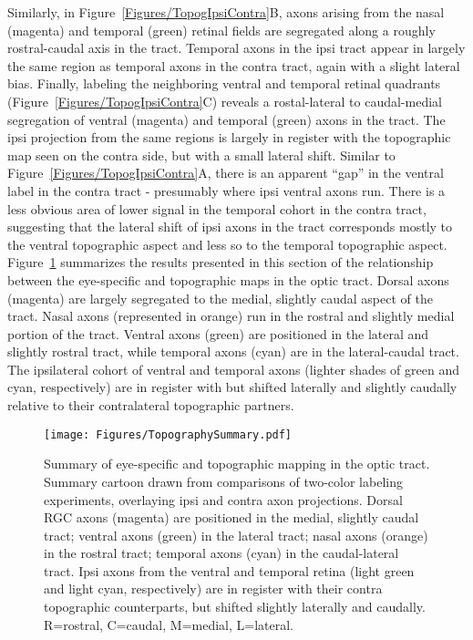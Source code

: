 Similarly, in Figure~\ref{Figures/TopogIpsiContra}B, axons arising from the nasal (magenta) and temporal (green) retinal fields are segregated along a roughly rostral-caudal axis in the tract.
Temporal axons in the ipsi tract appear in largely the same region as temporal axons in the contra tract, again with a slight lateral bias.
Finally, labeling the neighboring ventral and temporal retinal quadrants (Figure~\ref{Figures/TopogIpsiContra}C) reveals a rostal-lateral to caudal-medial segregation of ventral (magenta) and temporal (green) axons in the tract.
The ipsi projection from the same regions is largely in register with the topographic map seen on the contra side, but with a small lateral shift.
Similar to Figure~\ref{Figures/TopogIpsiContra}A, there is an apparent ``gap'' in the ventral label in the contra tract - presumably where ipsi ventral axons run.
There is a less obvious area of lower signal in the temporal cohort in the contra tract, suggesting that the lateral shift of ipsi axons in the tract corresponds mostly to the ventral topographic aspect and less so to the temporal topographic aspect.
Figure~\ref{Figures/TopographySummary} summarizes the results presented in this section of the relationship between the eye-specific and topographic maps in the optic tract.
Dorsal axons (magenta) are largely segregated to the medial, slightly caudal aspect of the tract.
Nasal axons (represented in orange) run in the rostral and slightly medial portion of the tract.
Ventral axons (green) are positioned in the lateral and slightly rostral tract, while temporal axons (cyan) are in the lateral-caudal tract.
The ipsilateral cohort of ventral and temporal axons (lighter shades of green and cyan, respectively) are in register with but shifted laterally and slightly caudally relative to their contralateral topographic partners.
\begin{figure}[hbtp]
    \begin{center}
        \texttt{[image: Figures/TopographySummary.pdf]}
        \caption[Summary of eye-specific and topographic mapping in the optic tract.]
        {Summary of eye-specific and topographic mapping in the optic tract.
        Summary cartoon drawn from comparisons of two-color labeling experiments, overlaying ipsi and contra axon projections.
        Dorsal RGC axons (magenta) are positioned in the medial, slightly caudal tract; ventral axons (green) in the lateral tract; nasal axons (orange) in the rostral tract; temporal axons (cyan) in the caudal-lateral tract.
        Ipsi axons from the ventral and temporal retina (light green and light cyan, respectively) are in register with their contra topographic counterparts, but shifted slightly laterally and caudally.
        R=rostral, C=caudal, M=medial, L=lateral.}
        \label{Figures/TopographySummary}
    \end{center}
\end{figure}
